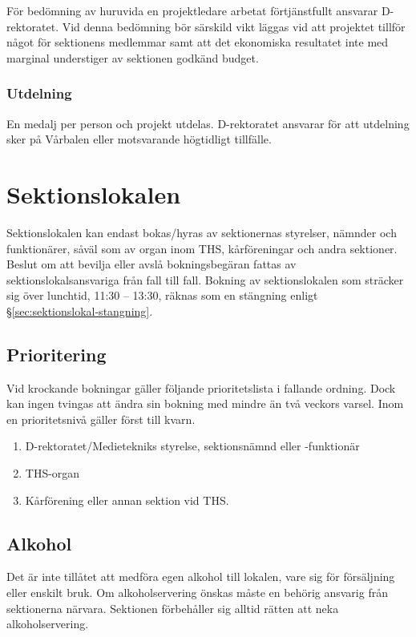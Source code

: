 \documentclass{dgovdoc}
\begin{document}
För bedömning av huruvida en projektledare arbetat förtjänstfullt ansvarar
D-rektoratet. Vid denna bedömning bör särskild vikt läggas vid att projektet
tillför något för sektionens medlemmar samt att det ekonomiska resultatet inte
med marginal understiger av sektionen godkänd budget.

\subsubsection{Utdelning}

En medalj per person och projekt utdelas. D-rektoratet ansvarar för att utdelning sker på Vårbalen eller motsvarande högtidligt tillfälle.

\section{Sektionslokalen}

Sektionslokalen kan endast bokas/hyras av sektionernas styrelser, nämnder och
funktionärer, såväl som av organ inom THS, kårföreningar och andra sektioner.
Beslut om att bevilja eller avslå bokningsbegäran fattas av
sektionslokalsansvariga från fall till fall. Bokning av sektionslokalen som
sträcker sig över lunchtid, 11:30 -- 13:30, räknas som en stängning enligt
\S\ref{sec:sektionslokal-stangning}.

\subsection{Prioritering}

Vid krockande bokningar gäller följande prioritetslista i fallande ordning.
Dock kan ingen tvingas att ändra sin bokning med mindre än två veckors varsel.
Inom en prioritetsnivå gäller först till kvarn.

\begin{enumerate}
  \item D-rektoratet/Medietekniks styrelse, sektionsnämnd eller -funktionär
  \item THS-organ
  \item Kårförening eller annan sektion vid THS.
\end{enumerate}

\subsection{Alkohol}

Det är inte tillåtet att medföra egen alkohol till lokalen, vare sig för
försäljning eller enskilt bruk. Om alkoholservering önskas måste en behörig
ansvarig från sektionerna närvara. Sektionen förbehåller sig alltid rätten att
neka alkoholservering.
\end{document}

